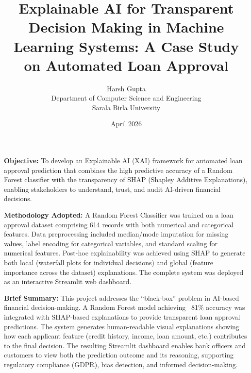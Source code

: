 \documentclass[12pt, a4paper]{article}
\title{\textbf{Explainable AI for Transparent Decision Making in Machine Learning Systems: A Case Study on Automated Loan Approval}}
\author{Harsh Gupta \\ Department of Computer Science and Engineering \\ Sarala Birla University}
\date{April 2026}
\begin{document}
\maketitle

\vspace{1cm}

\noindent\textbf{Objective:}
To develop an Explainable AI (XAI) framework for automated loan approval prediction that combines the high predictive accuracy of a Random Forest classifier with the transparency of SHAP (Shapley Additive Explanations), enabling stakeholders to understand, trust, and audit AI-driven financial decisions.

\vspace{0.5cm}

\noindent\textbf{Methodology Adopted:}
A Random Forest Classifier was trained on a loan approval dataset comprising 614 records with both numerical and categorical features. Data preprocessing included median/mode imputation for missing values, label encoding for categorical variables, and standard scaling for numerical features. Post-hoc explainability was achieved using SHAP to generate both local (waterfall plots for individual decisions) and global (feature importance across the dataset) explanations. The complete system was deployed as an interactive Streamlit web dashboard.

\vspace{0.5cm}

\noindent\textbf{Brief Summary:}
This project addresses the ``black-box'' problem in AI-based financial decision-making. A Random Forest model achieving ~81\% accuracy was integrated with SHAP-based explanations to provide transparent loan approval predictions. The system generates human-readable visual explanations showing how each applicant feature (credit history, income, loan amount, etc.) contributes to the final decision. The resulting Streamlit dashboard enables bank officers and customers to view both the prediction outcome and its reasoning, supporting regulatory compliance (GDPR), bias detection, and informed decision-making.

\newpage
\end{document}
